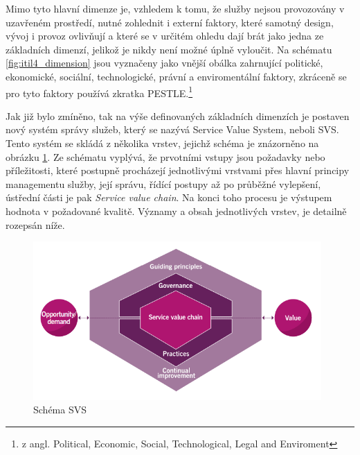 \documentclass[
  digital,     %
  twoside,     %
  lof,         %
  lot,         %
]{fithesis4}
\begin{document}
Mimo tyto hlavní dimenze je, vzhledem k tomu, že služby nejsou provozovány v uzavřeném prostředí, nutné zohlednit i externí faktory, které samotný design, vývoj i provoz ovlivňují a které se v určitém ohledu dají brát jako jedna ze základních dimenzí, jelikož je nikdy není možné úplně vyloučit. Na schématu \ref{fig:itil4_dimension} jsou vyznačeny jako vnější obálka zahrnující politické, ekonomické, sociální, technologické, právní a enviromentální faktory, zkráceně se pro tyto faktory používá zkratka PESTLE.\footnote{z angl. Political, Economic, Social, Technological, Legal and Enviroment}

\vspace{5}
Jak již bylo zmíněno, tak na výše definovaných základních dimenzích je postaven nový systém správy služeb, který se nazývá Service Value System, neboli SVS. Tento systém se skládá z několika vrstev, jejichž schéma je znázorněno na obrázku \ref{fig:SVS_schema}. Ze schématu vyplývá, že prvotními vstupy jsou požadavky nebo příležitosti, které postupně procházejí jednotlivými vrstvami přes hlavní principy managementu služby, její správu, řídící postupy až po průběžné vylepšení, ústřední části je pak \emph{Service value chain}. Na konci toho procesu je výstupem hodnota v požadované kvalitě. \parencite[s.~14]{Cartlidge2020} Významy a obsah jednotlivých vrstev, je detailně rozepsán níže. 
    \begin{figure}[h]
        \begin{center}
            \includegraphics[width=11cm]{img/SVS_schmea.png}
        \end{center}
        \caption{Schéma SVS \parencite[s.~21]{Cartlidge2020}}
        \label{fig:SVS_schema}
    \end{figure} 
\end{document}
